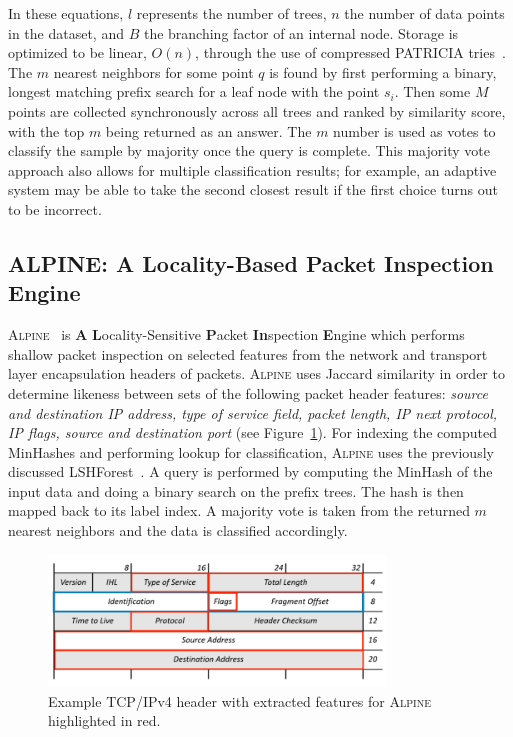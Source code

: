 In these equations, $l$ represents the number of trees, $n$ the number of data points in the dataset, and $B$ the branching factor of an internal node. Storage is optimized to be linear, $O(n)$, through the use of compressed PATRICIA tries~\cite{lshforest}. The $m$ nearest neighbors for some point $q$ is found by first performing a binary, longest matching prefix search for a leaf node with the point $s_i$. Then some $M$ points are collected synchronously across all trees and ranked by similarity score, with the top $m$ being returned as an answer. The $m$ number is used as votes to classify the sample by majority once the query is complete. This majority vote approach also allows for multiple classification results; for example, an adaptive system may be able to take the second closest result if the first choice turns out to be incorrect.

\subsection{ALPINE: A Locality-Based Packet Inspection Engine}
\textsc{Alpine}~\cite{alpinepalm} is \textbf{A} \textbf{L}ocality-Sensitive \textbf{P}acket \textbf{In}spection \textbf{E}ngine which performs shallow packet inspection on selected features from the network and transport layer encapsulation headers of packets. \textsc{Alpine} uses Jaccard similarity in order to determine likeness between sets of the following packet header features: \textit{source and destination IP address, type of service field, packet length, IP next protocol, IP flags, source and destination port} (see Figure~\ref{fig:alpineheader}). For indexing the computed MinHashes and performing lookup for classification, \textsc{Alpine} uses the previously discussed LSHForest~\cite{lshforest}. A query is performed by computing the MinHash of the input data and doing a binary search on the prefix trees. The hash is then mapped back to its label index. A majority vote is taken from the returned $m$ nearest neighbors and the data is classified accordingly.

\begin{figure} [ht!]
  \centering
  \includegraphics[width=0.8\textwidth]{chapters/4/img/alpineheader.png}
  \caption{Example TCP/IPv4 header with extracted features for \textsc{Alpine} highlighted in red.}
  \label{fig:alpineheader}
\end{figure}

